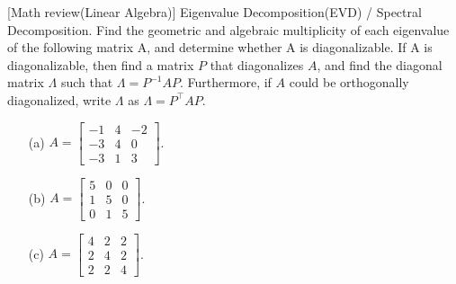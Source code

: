 \item {} [Math review(Linear Algebra)] Eigenvalue Decomposition(EVD) / Spectral Decomposition.
Find the geometric and algebraic multiplicity of each eigenvalue of the following matrix A, and determine whether A is diagonalizable. If A is diagonalizable, then find a matrix $P$ that diagonalizes $A$, and find the diagonal matrix $\Lambda$ such that $\Lambda = P^{-1}AP$. Furthermore, if $A$ could be orthogonally diagonalized, write $\Lambda$ as $\Lambda = P^{\top}AP$.

\begin{itemize}
    \item[(a)] $A=\begin{bmatrix} -1 & 4 & -2 \\ -3 & 4 & 0 \\ -3 & 1 & 3 \end{bmatrix}$. ~
    \item[(b)] $A=\begin{bmatrix} 5 & 0 & 0 \\ 1 & 5 & 0 \\ 0 & 1 & 5 \end{bmatrix}$. ~
    \item[(c)] $A=\begin{bmatrix} 4 & 2 & 2 \\ 2 & 4 & 2 \\ 2 & 2 & 4 \end{bmatrix}$. ~
\end{itemize}

\solution








\newpage